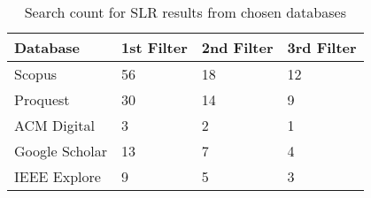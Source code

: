 \begin{table}[h!]
    \begin{center}
        \caption{Search count for SLR results from chosen databases}
        \label{tab:SLR_Count}
        \begin{tabular}{l|l|l|l} %
            \textbf{Database} & \textbf{1st Filter} & \textbf{2nd Filter} & \textbf{3rd Filter} \\
            \hline
            Scopus            & 56                  & 18                  & 12                  \\
            \hline
            Proquest          & 30                  & 14                  & 9                   \\
            \hline
            ACM Digital       & 3                   & 2                   & 1                   \\
            \hline
            Google Scholar    & 13                  & 7                   & 4                   \\
            \hline
            IEEE Explore      & 9                   & 5                   & 3                   \\
        \end{tabular}
    \end{center}
\end{table}



